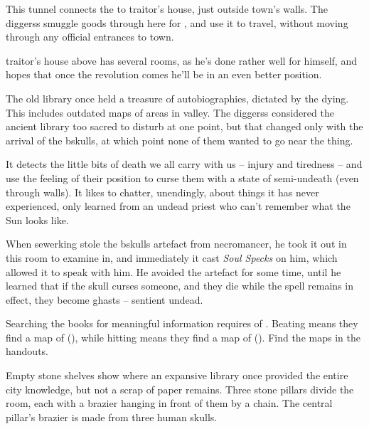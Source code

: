 \begin{multicols}{2}

This tunnel connects the  to \gls{traitor}'s house, just outside \gls{town}'s walls.
The \glspl{diggers} smuggle goods through here for , and use it to travel, without moving through any official entrances to \gls{town}.

\Gls{traitor}'s house above has several rooms, as he's done rather well for himself, and hopes that once the revolution comes he'll be in an even better position.


\begin{exampletext}
  The old library once held a treasure of autobiographies, dictated by the dying.
  This includes outdated maps of areas in \gls{valley}.
  The \glspl{diggers} considered the ancient library too sacred to disturb at one point, but that changed only with the arrival of the \gls{bskulls}, at which point none of them wanted to go near the thing.

  It detects the little bits of death we all carry with us -- injury and tiredness -- and use the feeling of their position to curse them with a state of semi-undeath (even through walls).
  It likes to chatter, unendingly, about things it has never experienced, only learned from an undead priest who can't remember what the Sun looks like.

  When \gls{sewerking} stole the \gls{bskulls} \gls{artefact} from \gls{necromancer}, he took it out in this room to examine in, and immediately it cast \textit{Soul Specks} on him, which allowed it to speak with him.
  He avoided the \gls{artefact} for some time, until he learned that if the skull curses someone, and they die while the spell remains in effect, they become ghasts -- sentient undead.%

\end{exampletext}

Searching the books for meaningful information requires  of .
Beating \tn[8] means they find a map of  (), while hitting \tn[11] means they find a map of  ().
Find the maps in the handouts.

\begin{boxtext}
  Empty stone shelves show where an expansive library once provided the entire city knowledge, but not a scrap of paper remains.
  Three stone pillars divide the room, each with a brazier hanging in front of them by a chain.
  The central pillar's brazier is made from three human skulls.
\end{boxtext}


\end{multicols}
